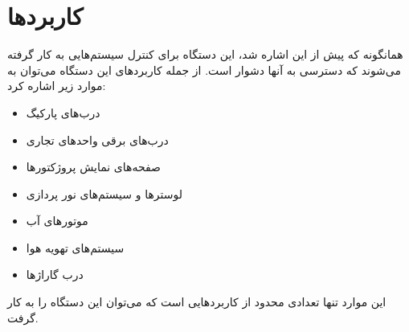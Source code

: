 % 
% 
% 
% 
% 
%
\section{کاربردها}

همانگونه که پیش از این اشاره شد، این دستگاه برای کنترل سیستم‌هایی به کار گرفته
می‌شوند که دسترسی به آنها دشوار است.
از جمله کاربردهای این دستگاه می‌توان به موارد زیر اشاره کرد:

\begin{itemize}
  \item درب‌های پارکیگ
  \item درب‌های برقی واحد‌های تجاری
  \item صفحه‌های نمایش پروژکتورها
  \item لوسترها و سیستم‌های نور پردازی
  \item موتورهای آب
  \item سیستم‌های تهویه هوا
  \item درب گاراژ‌ها
\end{itemize}

این موارد تنها تعدادی محدود از کاربردهایی است که می‌توان این دستگاه را به کار
گرفت.
